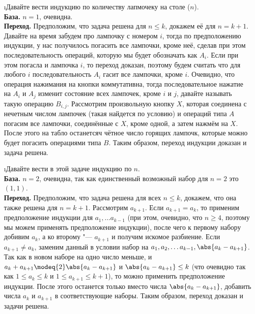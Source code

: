 \i Давайте вести индукцию по количеству лапмочеку на столе ($n$).\\
\textbf{База.} $n=1$, очевидна.\\
\textbf{Переход.} Предположим, что задача решена для $n \leq k$, докажем её для $n=k+1$. Давайте на время забудем про лампочку с номером $i$, тогда по предположению индукции, у нас получилось погасить все лампочки, кроме неё, сделав при этом последовательность операций, которую мы будет обозначать как $A_i$. Если при этом погасла и лампочка $i$, то переход доказан, поэтому будем считать что для любого $i$ последовательность $A_i$ гасит все лампочки, кроме $i$. Очевидно, что операция нажимания на кнопки коммутативна, тогда последовательное нажатие на $A_i$ и $A_j$ изменит состояние всех лампочек, кроме $i$ и $j$, давайте называть такую операцию $B_{i, j}$. Рассмотрим произвольную кнопку $X$, которая соединена с нечетным числом лампочек (такая найдется по условию) и операций типа $A$ погасим все лампочки, соединённые с $X$, кроме одной, а затем нажмём на $X$. После этого на табло останетсяч чётное число горящих лампочк, которые можно будет погасить операциями типа $B$. Таким образом, переход индукции доказан и задача решена.

\i Давайте вести в этой задаче индукцию по $n$.\\
\textbf{База.} $n=2$, очевидна, так как единственный возможный набор для $n=2$ это $(1,1)$.\\
\textbf{Переход.} Предположим, что задача решена для всех $n\leq k$, докажем, что она также решена для $n=k+1$. Рассмотрим $a_{k+1}$. Если $a_{k+1} = a_k$, то применим предположение индукции для $a_1, \ldots a_{k-1}$ (при этом, очевидно, что $n \geqslant 4$, поэтому мы можем применять предположение индукции), после чего к первому набору добивим $a_k$, а ко второму "--- $a_{k+1}$ и получим искомое разбиение. Если $a_{k+1} \ne a_k$, заменим данный в условии набор на $a_1, a_2, \ldots a_{k-1}, \abs{a_k - a_{k+1}}$. Так как в новом наборе на одно число меньше, и $a_k + a_{k+1} \modeq{2} \abs{a_k - a_{k+1}}$ и $\abs{a_k - a_{k+1}} \leq k$ (что очевидно так как $1 \leq a_k \leq k$ и $1 \leq a_{k+1} \leq k+1$), то можно применить предположение индукции. После этого останется только вместо числа $\abs{a_k - a_{k+1}}$, добавить числа $a_k$ и $a_{k+1}$ в соответствующие наборы. Таким образом, переход доказан и задачи решена.